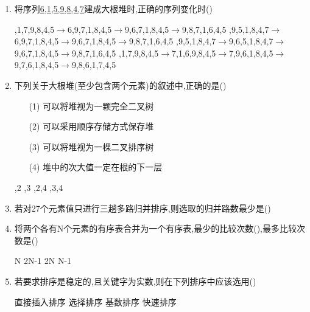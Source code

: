 \documentclass[12pt, a4paper, oneside, UTF8]{ctexbook}
\begin{document}
\begin{enumerate}
    \item 将序列\underline{6,1,5,9,8,4,7}建成大根堆时,正确的序列变化时() 
    \begin{choices}[1]
        ,1,7,9,8,4,5$\rightarrow$6,9,7,1,8,4,5$\rightarrow$9,6,7,1,8,4,5$\rightarrow$9,8,7,1,6,4,5
        ,9,5,1,8,4,7$\rightarrow$6,9,7,1,8,4,5$\rightarrow$9,6,7,1,8,4,5$\rightarrow$9,8,7,1,6,4,5
        ,9,5,1,8,4,7$\rightarrow$9,6,5,1,8,4,7$\rightarrow$9,6,7,1,8,4,5$\rightarrow$9,8,7,1,6,4,5
        ,1,7,9,8,4,5$\rightarrow$7,1,6,9,8,4,5$\rightarrow$7,9,6,1,8,4,5$\rightarrow$9,7,6,1,8,4,5$\rightarrow$9,8,6,1,7,4,5
    \end{choices}

    \item 下列关于大根堆(至少包含两个元素)的叙述中,正确的是()
    \begin{enumerate}
        \item [(1)]可以将堆视为一颗完全二叉树
        \item [(2)]可以采用顺序存储方式保存堆
        \item [(3)]可以将堆视为一棵二叉排序树
        \item [(4)]堆中的次大值一定在根的下一层
    \end{enumerate}
    \begin{choices}
        ,2
        ,3
        ,2,4
        ,3,4
    \end{choices}


    \item 若对27个元素值只进行三趟多路归并排序,则选取的归并路数最少是() 
    \begin{choices}
    \end{choices}


    \item 将两个各有N个元素的有序表合并为一个有序表,最少的比较次数(),最多比较次数是() 
    \begin{choices}
        \task N 
        \task 2N-1 
        \task 2N 
        \task N-1 
    \end{choices}
    
    \item 若要求排序是稳定的,且关键字为实数,则在下列排序中应该选用() 
    \begin{choices}
        \task 直接插入排序
        \task 选择排序
        \task 基数排序
        \task 快速排序 
    \end{choices}
    

\end{enumerate}
\end{document}
